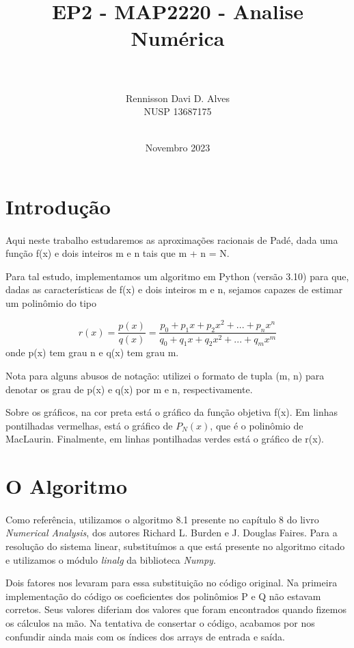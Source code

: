 \documentclass{article}
\title{EP2 - MAP2220 - Analise Numérica}
\author{\\ \\
        Rennisson Davi D. Alves \\%
        NUSP 13687175
        \\ \\}
\date{Novembro 2023}
\begin{document}
\maketitle

\section{Introdução}
    \paragraph{} Aqui neste trabalho estudaremos as aproximações racionais de Padé,
    dada uma função f(x) e dois inteiros m e n tais que m + n = N.

    Para tal estudo, implementamos um algoritmo em Python (versão 3.10) para que,
    dadas as características de f(x) e dois inteiros m e n, sejamos capazes de
    estimar um polinômio do tipo

    \begin{equation}
        r(x) = \frac{p(x)}{q(x)} = \frac{p_{0} + p_{1}x + p_{2}x^{2} + ... + p_{n}x^{n}}{q_{0} + q_{1}x + q_{2}x^{2} + ... + q_{m} x^{m}}
    \end{equation}
    onde p(x) tem grau n e q(x) tem grau m.

    Nota para alguns abusos de notação: utilizei o formato de tupla (m, n) para denotar os grau de p(x) e q(x) por m e n, respectivamente.
    
    Sobre os gráficos, na cor preta está o gráfico da função objetiva f(x). Em linhas pontilhadas vermelhas, está o gráfico de $P_{N}(x)$,
    que é o polinômio de MacLaurin. Finalmente, em linhas pontilhadas verdes está o gráfico de r(x).

\section{O Algoritmo}

    \paragraph{} Como referência, utilizamos o algoritmo 8.1 presente no capítulo 8 do livro
    \textit{Numerical Analysis}, dos autores Richard L. Burden e J. Douglas Faires.
    Para a resolução do sistema linear, substituímos a que está presente no algoritmo citado
    e utilizamos o módulo \textit{linalg} da biblioteca \textit{Numpy}.

    Dois fatores nos levaram para essa substituição no código original.
    Na primeira implementação do código os coeficientes dos polinômios P e Q não estavam
    corretos. Seus valores diferiam dos valores que foram encontrados quando fizemos os cálculos
    na mão. Na tentativa de consertar o código, acabamos por nos confundir ainda mais com os
    índices dos arrays de entrada e saída.
\end{document}
